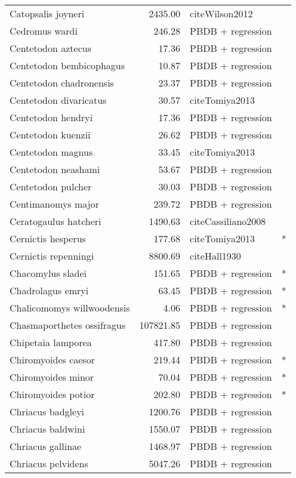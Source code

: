 \begin{table}[ht]
\begin{tabular}{lrll}
  Catopsalis joyneri & 2435.00 & cite{Wilson2012} &  \\ 
  Cedromus wardi & 246.28 & PBDB + regression &  \\ 
  Centetodon aztecus & 17.36 & PBDB + regression &  \\ 
  Centetodon bembicophagus & 10.87 & PBDB + regression &  \\ 
  Centetodon chadronensis & 23.37 & PBDB + regression &  \\ 
  Centetodon divaricatus & 30.57 & cite{Tomiya2013} &  \\ 
  Centetodon hendryi & 17.36 & PBDB + regression &  \\ 
  Centetodon kuenzii & 26.62 & PBDB + regression &  \\ 
  Centetodon magnus & 33.45 & cite{Tomiya2013} &  \\ 
  Centetodon neashami & 53.67 & PBDB + regression &  \\ 
  Centetodon pulcher & 30.03 & PBDB + regression &  \\ 
  Centimanomys major & 239.72 & PBDB + regression &  \\ 
  Ceratogaulus hatcheri & 1490.63 & cite{Cassiliano2008} &  \\ 
  Cernictis hesperus & 177.68 & cite{Tomiya2013} & * \\ 
  Cernictis repenningi & 8800.69 & cite{Hall1930} &  \\ 
  Chacomylus sladei & 151.65 & PBDB + regression & * \\ 
  Chadrolagus emryi & 63.45 & PBDB + regression & * \\ 
  Chalicomomys willwoodensis & 4.06 & PBDB + regression & * \\ 
  Chasmaporthetes ossifragus & 107821.85 & PBDB + regression &  \\ 
  Chipetaia lamporea & 417.80 & PBDB + regression &  \\ 
  Chiromyoides caesor & 219.44 & PBDB + regression & * \\ 
  Chiromyoides minor & 70.04 & PBDB + regression & * \\ 
  Chiromyoides potior & 202.80 & PBDB + regression & * \\ 
  Chriacus badgleyi & 1200.76 & PBDB + regression &  \\ 
  Chriacus baldwini & 1550.07 & PBDB + regression &  \\ 
  Chriacus gallinae & 1468.97 & PBDB + regression &  \\ 
  Chriacus pelvidens & 5047.26 & PBDB + regression &  \\ 

\end{tabular}
\end{table}
